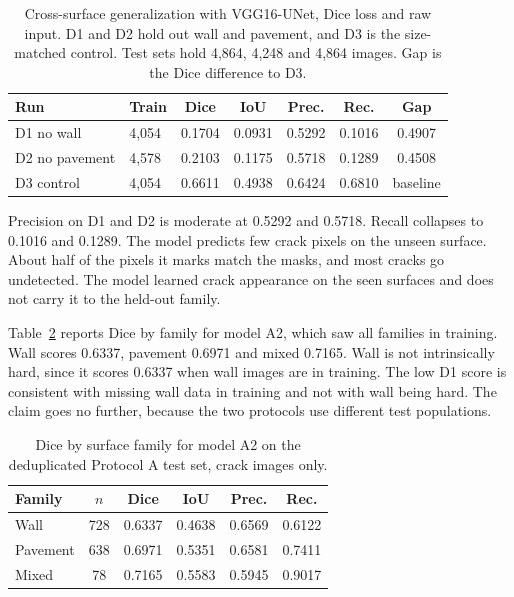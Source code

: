 \documentclass[conference]{IEEEtran}
\begin{document}
\begin{table}[t]
\caption{Cross-surface generalization with VGG16-UNet, Dice loss and raw input. D1 and D2 hold out wall and pavement, and D3 is the size-matched control. Test sets hold 4,864, 4,248 and 4,864 images. Gap is the Dice difference to D3.}
\label{tab:gen}
\centering
\scriptsize
\setlength{\tabcolsep}{2.5pt}
\begin{tabular}{llccccc}
\toprule
Run & Train & Dice & IoU & Prec. & Rec. & Gap \\
\midrule
D1 no wall & 4,054 & 0.1704 & 0.0931 & 0.5292 & 0.1016 & 0.4907 \\
D2 no pavement & 4,578 & 0.2103 & 0.1175 & 0.5718 & 0.1289 & 0.4508 \\
D3 control & 4,054 & 0.6611 & 0.4938 & 0.6424 & 0.6810 & baseline \\
\bottomrule
\end{tabular}
\end{table}

Precision on D1 and D2 is moderate at 0.5292 and 0.5718. Recall collapses to 0.1016 and 0.1289. The model predicts few crack pixels on the unseen surface. About half of the pixels it marks match the masks, and most cracks go undetected. The model learned crack appearance on the seen surfaces and does not carry it to the held-out family.

Table~\ref{tab:family} reports Dice by family for model A2, which saw all families in training. Wall scores 0.6337, pavement 0.6971 and mixed 0.7165. Wall is not intrinsically hard, since it scores 0.6337 when wall images are in training. The low D1 score is consistent with missing wall data in training and not with wall being hard. The claim goes no further, because the two protocols use different test populations.

\begin{table}[t]
\caption{Dice by surface family for model A2 on the deduplicated Protocol A test set, crack images only.}
\label{tab:family}
\centering
\scriptsize
\setlength{\tabcolsep}{3pt}
\begin{tabular}{lccccc}
\toprule
Family & $n$ & Dice & IoU & Prec. & Rec. \\
\midrule
Wall & 728 & 0.6337 & 0.4638 & 0.6569 & 0.6122 \\
Pavement & 638 & 0.6971 & 0.5351 & 0.6581 & 0.7411 \\
Mixed & 78 & 0.7165 & 0.5583 & 0.5945 & 0.9017 \\
\bottomrule
\end{tabular}
\end{table}
\end{document}

